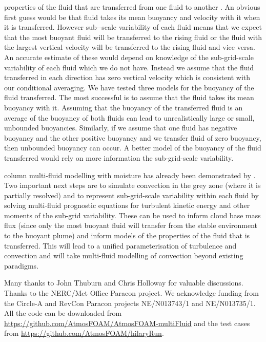 \documentclass[draft]{agujournal2019}
\begin{document}
 properties of the fluid that are transferred from one fluid to another . An obvious
first guess would be that fluid takes its mean buoyancy and velocity
with it when it is transferred. However sub--scale variability
of each fluid means that we expect that the most buoyant fluid will
be transferred to the rising fluid or the fluid with the largest vertical
velocity will be transferred to the rising fluid and vice versa. An
accurate estimate of these would depend on knowledge of the sub-grid-scale
variability of each fluid which we do not have. Instead we assume
that the fluid transferred in each direction has zero vertical velocity
which is consistent with our conditional averaging. We have tested
three models for the buoyancy of the fluid transferred. The most successful
is to assume that the fluid takes its mean buoyancy with it. Assuming
that the buoyancy of the transferred fluid is an average of the buoyancy
of both fluids can lead to unrealistically large or small, unbounded
buoyancies. Similarly, if we assume that one fluid has negative buoyancy
and the other positive buoyancy and we transfer fluid of zero buoyancy,
then unbounded buoyancy can occur. A better model of the buoyancy
of the fluid transferred would rely on more information the sub-grid-scale
variability.

 column multi-fluid modelling with moisture has already been
demonstrated by  
.
Two important next steps are to simulate
convection in the grey zone (where it is partially resolved) and to
represent sub-grid-scale variability within each fluid by solving
multi-fluid prognostic equations for turbulent kinetic energy and
other moments of the sub-grid variability. These can be used to inform
cloud base mass flux (since only the most buoyant fluid will transfer
from the stable environment to the buoyant plume) and inform models
of the properties of the fluid that is transferred. This will lead
to a unified parameterisation of turbulence and convection and will
take multi-fluid modelling of convection beyond existing paradigms. 

\acknowledgments

Many thanks to John Thuburn and Chris Holloway for valuable discussions.
Thanks to the NERC/Met Office Paracon project. We acknowledge funding
from the Circle-A and RevCon Paracon projects NE/N013743/1 and NE/N013735/1. All the code can be downloaded from \url{https://github.com/AtmosFOAM/AtmosFOAM-multiFluid} and the test cases from \url{https://github.com/AtmosFOAM/hilaryRun}.


\end{document}
